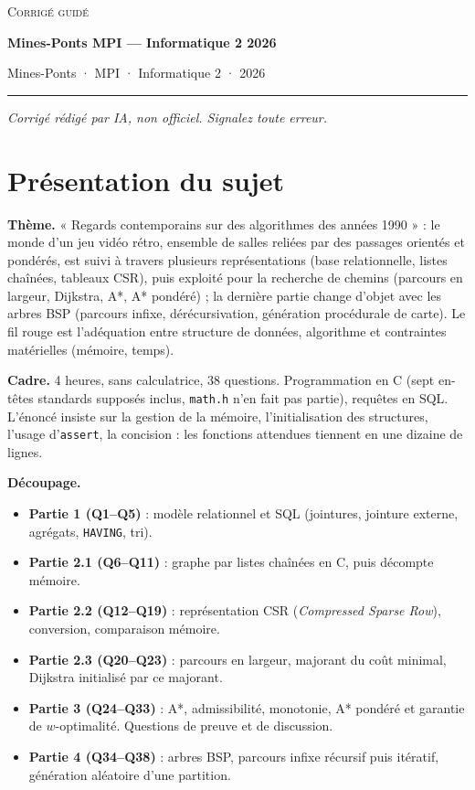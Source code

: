 \documentclass[11pt,a4paper]{article}
\providecommand{\tightlist}{\setlength{\itemsep}{0pt}\setlength{\parskip}{0pt}}
\begin{document}
\thispagestyle{plain}
\begin{center}
  {\small\scshape Corrigé guidé}\par\smallskip
  {\LARGE\bfseries Mines-Ponts MPI — Informatique 2 2026\par}\medskip
  {\large Mines-Ponts · MPI · Informatique 2 · 2026\par}
\end{center}
\vspace{2pt}\hrule\vspace{8pt}

\emph{Corrigé rédigé par IA, non officiel. Signalez toute erreur.}

\hypertarget{pruxe9sentation-du-sujet}{%
\section{Présentation du sujet}\label{pruxe9sentation-du-sujet}}

\textbf{Thème.} « Regards contemporains sur des algorithmes des années 1990 » : le monde d'un jeu vidéo rétro, ensemble de salles reliées par des passages orientés et pondérés, est suivi à travers plusieurs représentations (base relationnelle, listes chaînées, tableaux CSR), puis exploité pour la recherche de chemins (parcours en largeur, Dijkstra, A*, A* pondéré) ; la dernière partie change d'objet avec les arbres BSP (parcours infixe, dérécursivation, génération procédurale de carte). Le fil rouge est l'adéquation entre structure de données, algorithme et contraintes matérielles (mémoire, temps).

\textbf{Cadre.} 4 heures, sans calculatrice, 38 questions. Programmation en C (sept en-têtes standards supposés inclus, \texttt{math.h} n'en fait pas partie), requêtes en SQL. L'énoncé insiste sur la gestion de la mémoire, l'initialisation des structures, l'usage d'\texttt{assert}, la concision : les fonctions attendues tiennent en une dizaine de lignes.

\textbf{Découpage.}

\begin{itemize}
\tightlist
\item
  \textbf{Partie 1 (Q1--Q5)} : modèle relationnel et SQL (jointures, jointure externe, agrégats, \texttt{HAVING}, tri).
\item
  \textbf{Partie 2.1 (Q6--Q11)} : graphe par listes chaînées en C, puis décompte mémoire.
\item
  \textbf{Partie 2.2 (Q12--Q19)} : représentation CSR (\emph{Compressed Sparse Row}), conversion, comparaison mémoire.
\item
  \textbf{Partie 2.3 (Q20--Q23)} : parcours en largeur, majorant du coût minimal, Dijkstra initialisé par ce majorant.
\item
  \textbf{Partie 3 (Q24--Q33)} : A*, admissibilité, monotonie, A* pondéré et garantie de \(w\)-optimalité. Questions de preuve et de discussion.
\item
  \textbf{Partie 4 (Q34--Q38)} : arbres BSP, parcours infixe récursif puis itératif, génération aléatoire d'une partition.
\end{itemize}
\end{document}
